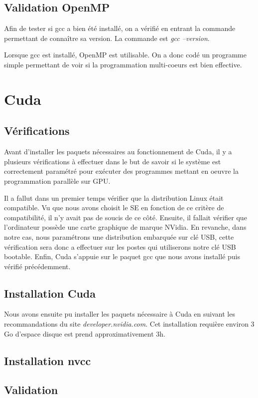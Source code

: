 \documentclass[final]{polytech/polytech}
\begin{document}
\subsection{Validation OpenMP}
Afin de tester si gcc a bien été installé, on a vérifié en entrant la commande permettant de connaître sa version. La commande est \textit{gcc --version}.

Lorsque gcc est installé, OpenMP est utilisable. On a donc codé un programme simple permettant de voir si la programmation multi-coeurs est bien effective.

\section{Cuda}

\subsection{Vérifications}
Avant d'installer les paquets nécessaires au fonctionnement de Cuda, il y a plusieurs vérifications à effectuer dans le but de savoir si le système est correctement paramétré pour exécuter des programmes mettant en oeuvre la programmation parallèle sur GPU.

Il a fallut dans un premier temps vérifier que la distribution Linux était compatible. Vu que nous avons choisit le SE en fonction de ce critère de compatibilité, il n'y avait pas de soucis de ce côté. Ensuite, il fallait vérifier que l'ordinateur possède une carte graphique de marque NVidia. En revanche, dans notre cas, nous paramétrons une distribution embarquée sur clé USB, cette vérification sera donc a effectuer sur les postes qui utiliserons notre clé USB bootable. Enfin, Cuda s'appuie sur le paquet gcc que nous avons installé puis vérifié précédemment.

\subsection{Installation Cuda}
Nous avons ensuite pu installer les paquets nécessaire à Cuda en suivant les recommandations du site \textit{developer.nvidia.com}. Cet installation requière environ 3 Go d'espace disque est prend approximativement 3h.

\subsection{Installation nvcc}

\subsection{Validation}
\end{document}
